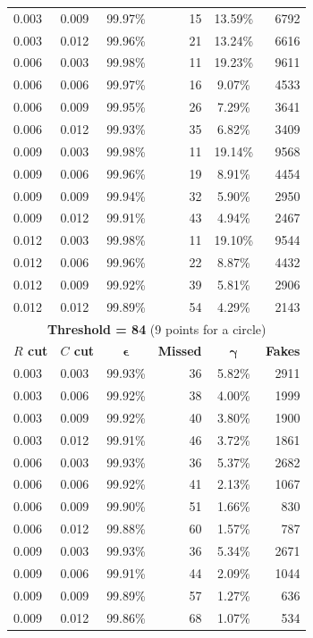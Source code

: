 \documentclass[11pt,twoside]{scrreprt}
\begin{document}
\begin{longtable}{llcrcr}
0.003 & 0.009 & 99.97\% & 15 & 13.59\% & 6792 \\
0.003 & 0.012 & 99.96\% & 21 & 13.24\% & 6616 \\
0.006 & 0.003 & 99.98\% & 11 & 19.23\% & 9611 \\
0.006 & 0.006 & 99.97\% & 16 & 9.07\% & 4533 \\
0.006 & 0.009 & 99.95\% & 26 & 7.29\% & 3641 \\
0.006 & 0.012 & 99.93\% & 35 & 6.82\% & 3409 \\
0.009 & 0.003 & 99.98\% & 11 & 19.14\% & 9568 \\
0.009 & 0.006 & 99.96\% & 19 & 8.91\% & 4454 \\
0.009 & 0.009 & 99.94\% & 32 & 5.90\% & 2950 \\
0.009 & 0.012 & 99.91\% & 43 & 4.94\% & 2467 \\
0.012 & 0.003 & 99.98\% & 11 & 19.10\% & 9544 \\
0.012 & 0.006 & 99.96\% & 22 & 8.87\% & 4432 \\
0.012 & 0.009 & 99.92\% & 39 & 5.81\% & 2906 \\
0.012 & 0.012 & 99.89\% & 54 & 4.29\% & 2143 \\
\bottomrule
\toprule
\multicolumn{6}{c}{\textbf{Threshold = 84} (9 points for a circle)}\\
\midrule
\textbf{$R$ cut} & \textbf{$C$ cut} & $\boldsymbol{\epsilon}$ & \textbf{Missed} & $\boldsymbol{\gamma}$ & \textbf{Fakes} \\
\midrule
0.003 & 0.003 & 99.93\% & 36 & 5.82\% & 2911 \\
0.003 & 0.006 & 99.92\% & 38 & 4.00\% & 1999 \\
0.003 & 0.009 & 99.92\% & 40 & 3.80\% & 1900 \\
0.003 & 0.012 & 99.91\% & 46 & 3.72\% & 1861 \\
0.006 & 0.003 & 99.93\% & 36 & 5.37\% & 2682 \\
0.006 & 0.006 & 99.92\% & 41 & 2.13\% & 1067 \\
0.006 & 0.009 & 99.90\% & 51 & 1.66\% & 830 \\
0.006 & 0.012 & 99.88\% & 60 & 1.57\% & 787 \\
0.009 & 0.003 & 99.93\% & 36 & 5.34\% & 2671 \\
0.009 & 0.006 & 99.91\% & 44 & 2.09\% & 1044 \\
0.009 & 0.009 & 99.89\% & 57 & 1.27\% & 636 \\
0.009 & 0.012 & 99.86\% & 68 & 1.07\% & 534 \\

\end{longtable}
\end{document}
